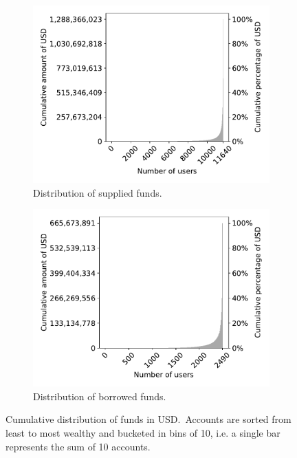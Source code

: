 \begin{figure}[tbp]
  \begin{subfigure}{.5\textwidth}
    \centering
    \includegraphics[width=\textwidth]{./5b-economic-security/figures/suppliers-distribution.pdf}
    \caption{Distribution of supplied funds.}
    \label{fig:suppliers-distribution}
  \end{subfigure}
  \begin{subfigure}{.5\textwidth}
    \centering
    \includegraphics[width=\textwidth]{./5b-economic-security/figures/borrowers-distribution.pdf}
    \caption{Distribution of borrowed funds.}
    \label{fig:borrowers-distribution}
  \end{subfigure}
  \caption[Cumulative distribution of funds in USD on Compound]{Cumulative distribution of funds in USD.~Accounts are sorted from least to most wealthy and bucketed in bins of 10, i.e. a single bar represents the sum of 10 accounts.}\label{fig:suppliers-borrowers-distribution}
\end{figure}


